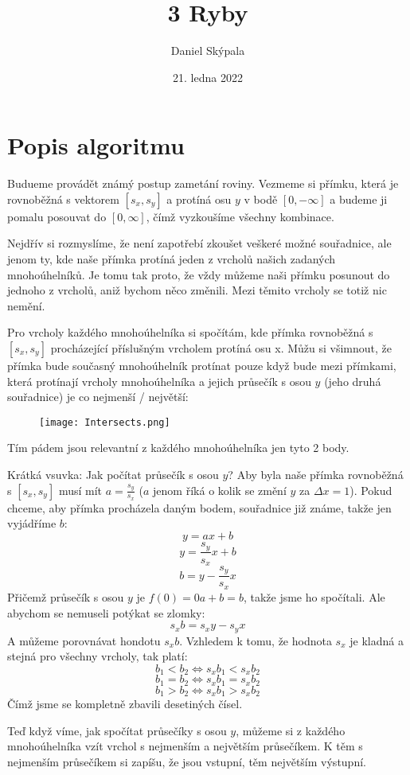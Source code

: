 \documentclass{article}
\title{3 Ryby}
\author{Daniel Skýpala}
\date{21. ledna 2022}
\begin{document}
\maketitle

\section*{Popis algoritmu}

Budueme provádět známý postup zametání roviny. Vezmeme si přímku, která je rovnoběžná s vektorem \([s_x, s_y]\) a protíná osu \(y\) v bodě
\([0, -\infty]\) a budeme ji pomalu posouvat do \([0, \infty]\), čímž vyzkoušíme všechny kombinace.

Nejdřív si rozmyslíme, že není zapotřebí zkoušet veškeré možné souřadnice, ale jenom ty, kde naše přímka protíná jeden z vrcholů našich zadaných mnohoúhelníků.
Je tomu tak proto, že vždy můžeme naši přímku posunout do jednoho z vrcholů, aniž bychom něco změnili. Mezi těmito vrcholy se totiž nic nemění.

Pro vrcholy každého mnohoúhelníka si spočítám, kde přímka rovnoběžná s \([s_x, s_y]\) procházející příslušným vrcholem protíná osu x. Můžu si všimnout,
že přímka bude současný mnohoúhelník protínat pouze když bude mezi přímkami, která protínají vrcholy mnohoúhelníka a jejich průsečík s osou \(y\)
(jeho druhá souřadnice) je co nejmenší / největší:
\begin{figure}[h]
    \centering
    \texttt{[image: Intersects.png]}
\end{figure}

Tím pádem jsou relevantní z každého mnohoúhelníka jen tyto 2 body.

Krátká vsuvka: Jak počítat průsečík s osou \(y\)? Aby byla naše přímka rovnoběžná s \([s_x, s_y]\) musí mít \(a = \frac{s_y}{s_x}\) (\(a\) jenom říká 
o kolik se změní \(y\) za \(\Delta x=1\)). Pokud chceme, aby přímka procházela daným bodem, souřadnice již známe, takže jen vyjádříme \(b\):
\[y = ax + b\]
\[y = \frac{s_y}{s_x}x + b\]
\[b = y - \frac{s_y}{s_x}x\]
Přičemž průsečík s osou \(y\) je \(f(0) = 0a+b = b\), takže jsme ho spočítali. Ale abychom se nemuseli potýkat se zlomky:
\[s_x b = s_x y - s_y x\]
A můžeme porovnávat hondotu \(s_x b\). Vzhledem k tomu, že hodnota \(s_x\) je kladná a stejná pro všechny vrcholy, tak platí:
\[b_1 < b_2 \Leftrightarrow s_x b_1 < s_x b_2\]
\[b_1 = b_2 \Leftrightarrow s_x b_1 = s_x b_2\]
\[b_1 > b_2 \Leftrightarrow s_x b_1 > s_x b_2\]
Čímž jsme se kompletně zbavili desetiných čísel.

Teď když víme, jak spočítat průsečíky s osou \(y\), můžeme si z každého mnohoúhelníka vzít vrchol s nejmenším a největším průsečíkem. K těm
s nejmenším průsečíkem si zapíšu, že jsou vstupní, těm největším výstupní.
\end{document}

